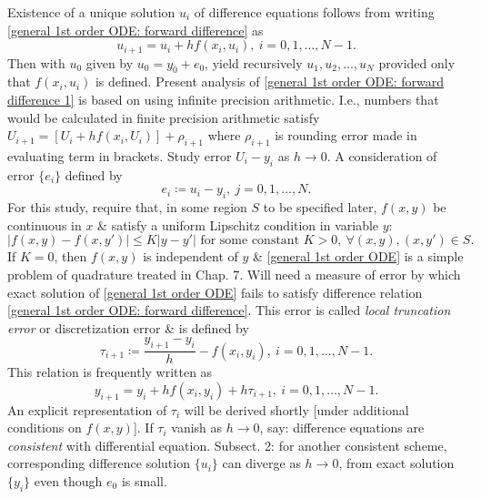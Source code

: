 \documentclass{article}
\begin{document}
\begin{itemize}
\begin{itemize}
		Existence of a unique solution $u_i$ of difference equations follows from writing \eqref{general 1st order ODE: forward difference} as
		\begin{equation}
			\label{general 1st order ODE: forward difference 1}
			u_{i+1} = u_i + hf(x_i,u_i),\ i = 0,1,\ldots,N - 1.
		\end{equation}
		Then with $u_0$ given by $u_0 = y_0 + e_0$, yield recursively $u_1,u_2,\ldots,u_N$ provided only that $f(x_i,u_i)$ is defined. Present analysis of \eqref{general 1st order ODE: forward difference 1} is based on using infinite precision arithmetic. I.e., numbers that would be calculated in finite precision arithmetic satisfy $U_{i+1} = [U_i + hf(x_i,U_i)] + \rho_{i+1}$ where $\rho_{i+1}$ is rounding error made in evaluating term in brackets. Study error $U_i - y_i$ as $h\to0$. A consideration of error $\{e_i\}$ defined by
		\begin{equation}
			\label{error}
			\tag{err}
			e_i\coloneqq u_i - y_i,\ j = 0,1,\ldots,N.
		\end{equation}
		For this study, require that, in some region $S$ to be specified later, $f(x,y)$ be continuous in $x$ \& satisfy a uniform Lipschitz condition in variable $y$:
		\begin{equation}
			\label{Lipschitz condition}
			|f(x,y) - f(x,y')|\le K|y - y'|\mbox{ for some constant } K > 0,\ \forall(x,y),(x,y')\in S.
		\end{equation}
		If $K = 0$, then $f(x,y)$ is independent of $y$ \& \eqref{general 1st order ODE} is a simple problem of quadrature treated in Chap. 7. Will need a measure of error by which exact solution of \eqref{general 1st order ODE} fails to satisfy difference relation \eqref{general 1st order ODE: forward difference}. This error is called {\it local truncation error} or discretization error \& is defined by
		\begin{equation}
			\label{local truncation error}
			\tau_{i+1}\coloneqq\frac{y_{i+1} - y_i}{h} - f(x_i,y_i),\ i = 0,1,\ldots,N - 1.
		\end{equation}
		This relation is frequently written as
		\begin{equation}
			\label{local truncation error 1}
			y_{i+1} = y_i + hf(x_i,y_i) + h\tau_{i+1},\ i = 0,1,\ldots,N - 1.
		\end{equation}
		An explicit representation of $\tau_i$ will be derived shortly [under additional conditions on $f(x,y)$]. If $\tau_i$ vanish as $h\to0$, say: difference equations are {\it consistent} with differential equation. Subsect. 2: for another consistent scheme, corresponding difference solution $\{u_i\}$ can diverge as $h\to0$, from exact solution $\{y_i\}$ even though $e_0$ is small.
		

\end{itemize}
\end{itemize}
\end{document}
